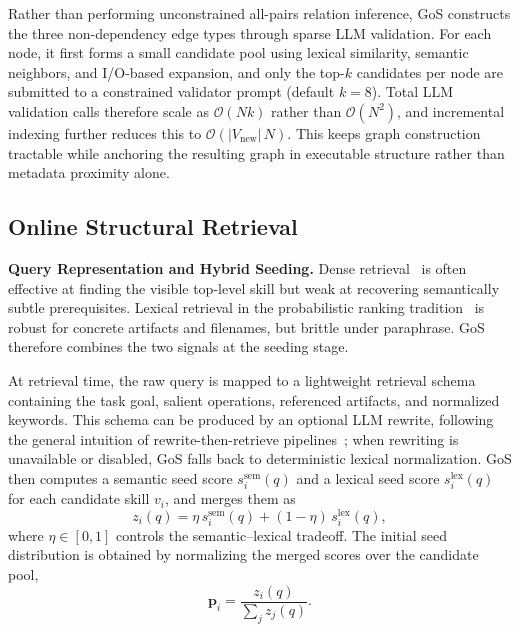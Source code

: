 Rather than performing unconstrained all-pairs relation inference, GoS constructs the three non-dependency edge types through sparse LLM validation. For each node, it first forms a small candidate pool using lexical similarity, semantic neighbors, and I/O-based expansion, and only the top-$k$ candidates per node are submitted to a constrained validator prompt (default $k{=}8$). Total LLM validation calls therefore scale as $\mathcal{O}(N k)$ rather than $\mathcal{O}(N^2)$, and incremental indexing further reduces this to $\mathcal{O}(|V_{\mathrm{new}}|\,N)$. This keeps graph construction tractable while anchoring the resulting graph in executable structure rather than metadata proximity alone.

\subsection{Online Structural Retrieval}
\noindent\textbf{Query Representation and Hybrid Seeding.}
Dense retrieval~\citep{karpukhin2020dense} is often effective at finding the visible top-level skill but weak at recovering semantically subtle prerequisites. Lexical retrieval in the probabilistic ranking tradition~\citep{robertson2009probabilistic} is robust for concrete artifacts and filenames, but brittle under paraphrase. GoS therefore combines the two signals at the seeding stage.

At retrieval time, the raw query is mapped to a lightweight retrieval schema containing the task goal, salient operations, referenced artifacts, and normalized keywords. This schema can be produced by an optional LLM rewrite, following the general intuition of rewrite-then-retrieve pipelines~\citep{ma2023query}; when rewriting is unavailable or disabled, GoS falls back to deterministic lexical normalization. GoS then computes a semantic seed score $s_i^{\mathrm{sem}}(q)$ and a lexical seed score $s_i^{\mathrm{lex}}(q)$ for each candidate skill $v_i$, and merges them as
\begin{equation}
 z_i(q) = \eta \, s_i^{\mathrm{sem}}(q) + (1-\eta) \, s_i^{\mathrm{lex}}(q),
 \label{eq:seed}
\end{equation}
where $\eta \in [0,1]$ controls the semantic--lexical tradeoff. The initial seed distribution is obtained by normalizing the merged scores over the candidate pool,
\begin{equation}
\mathbf{p}_i = \frac{z_i(q)}{\sum_j z_j(q)}.
\end{equation}

